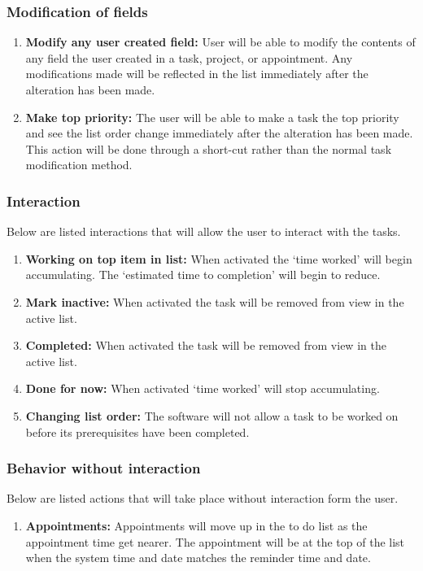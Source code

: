 \documentclass[12pt,a4paper]{article}
\begin{document}
\subsubsection{Modification of fields}
\begin{enumerate}
\item \textbf{Modify any user created field:} User will be able to modify the contents of any field the user created in a task, project, or appointment.  Any modifications made will be reflected in the list immediately after the alteration has been made.
\item \textbf{Make top priority:} The user will be able to make a task the top priority and see the list order change immediately after the alteration has been made.  This action will be done through a short-cut rather than the normal task modification method.
\end{enumerate}

\subsubsection{Interaction}
Below are listed interactions that will allow the user to interact with the tasks.
\begin{enumerate}
\item \textbf{Working on top item in list:} When activated the `time worked' will begin accumulating. The `estimated time to completion' will begin to reduce.
\item \textbf{Mark inactive:} When activated the task will be removed from view in the active list.
\item \textbf{Completed:} When activated the task will be removed from view in the active list.
\item \textbf{Done for now:} When activated `time worked' will stop accumulating.
\item \textbf{Changing list order:} The software will not allow a task to be worked on before its prerequisites have been completed. 
\end{enumerate}

\subsubsection{Behavior without interaction}
Below are listed actions that will take place without interaction form the user.
\begin{enumerate}
\item \textbf{Appointments:} Appointments will move up in the to do list as the appointment time get nearer.  The appointment will be at the top of the list when the system time and date matches the reminder time and date.
\end{enumerate}
\end{document}
